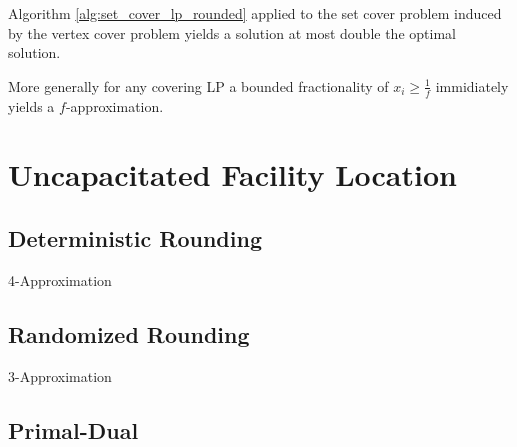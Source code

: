 \begin{kor}
    Algorithm \ref{alg:set_cover_lp_rounded} applied to the set cover problem induced by the vertex cover problem yields a solution at most double the optimal solution.
    \begin{note}
        More generally for any covering LP a bounded fractionality of $x_i \ge \frac{1}{f}$ immidiately yields a $f$-approximation.
    \end{note}
\end{kor}



\section{Uncapacitated Facility Location}

\subsection{Deterministic Rounding}

4-Approximation

\subsection{Randomized Rounding}

3-Approximation

\subsection{Primal-Dual}




